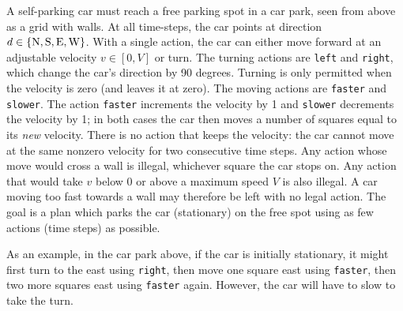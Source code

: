 \documentclass[11pt, a4paper]{exam}
\begin{document}
\begin{exercises}[1, 3 (a)--(c), 5]
A self-parking car must reach a free parking spot in a car park, seen from above as a grid with walls. At all time-steps, the car points at direction $d \in \{\text{N}, \text{S}, \text{E}, \text{W}\}$. With a single action, the car can either move forward at an adjustable velocity $v \in [0, V]$ or turn. The turning actions are \texttt{left} and \texttt{right}, which change the car's direction by 90 degrees. Turning is only permitted when the velocity is zero (and leaves it at zero). The moving actions are \texttt{faster} and \texttt{slower}. The action \texttt{faster} increments the velocity by 1 and \texttt{slower} decrements the velocity by 1; in both cases the car then moves a number of squares equal to its \emph{new} velocity. There is no action that keeps the velocity: the car cannot move at the same nonzero velocity for two consecutive time steps. Any action whose move would cross a wall is illegal, whichever square the car stops on. Any action that would take $v$ below 0 or above a maximum speed $V$ is also illegal. A car moving too fast towards a wall may therefore be left with no legal action. The goal is a plan which parks the car (stationary) on the free spot using as few actions (time steps) as possible.

\begin{center}
\end{center}

As an example, in the car park above, if the car is initially stationary, it might first turn to the east using \texttt{right}, then move one square east using \texttt{faster}, then two more squares east using \texttt{faster} again. However, the car will have to slow to take the turn.

\end{exercises}
\end{document}
